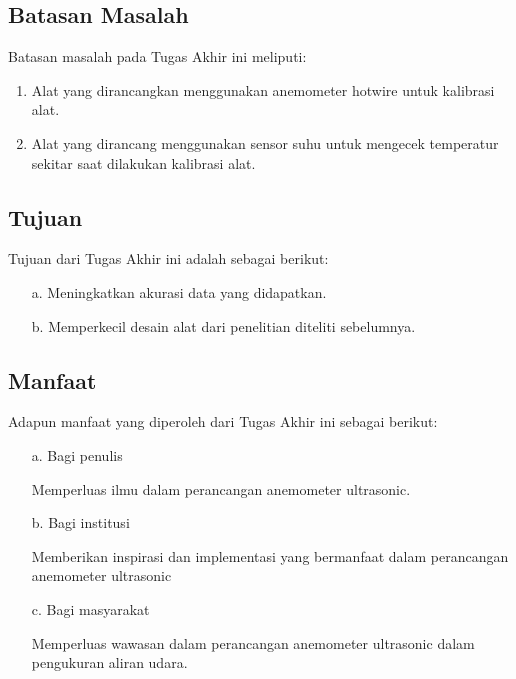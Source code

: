 \subsection{Batasan Masalah}

Batasan masalah pada Tugas Akhir ini meliputi:
\begin{enumerate}
	\item Alat yang dirancangkan menggunakan anemometer hotwire untuk kalibrasi alat.
	\item Alat yang dirancang menggunakan sensor suhu untuk mengecek temperatur sekitar saat dilakukan kalibrasi alat.
\end{enumerate}

\subsection{Tujuan}

Tujuan dari Tugas Akhir ini adalah sebagai berikut:
\begin{enumerate}
	\item[a.]	Meningkatkan akurasi data yang didapatkan.
	\item[b.]	Memperkecil desain alat dari penelitian diteliti sebelumnya.
\end{enumerate}

\subsection{Manfaat}

Adapun manfaat yang diperoleh dari Tugas Akhir ini sebagai berikut:
\begin{enumerate}
	\item [a.]	Bagi penulis 
	
	Memperluas ilmu dalam perancangan anemometer ultrasonic.
	
	\item [b.]	Bagi institusi
	
	 Memberikan inspirasi dan implementasi yang bermanfaat dalam perancangan anemometer ultrasonic
	
	\item [c.]	Bagi masyarakat
	
	Memperluas wawasan dalam perancangan anemometer ultrasonic dalam pengukuran aliran udara.
	
\end{enumerate}
